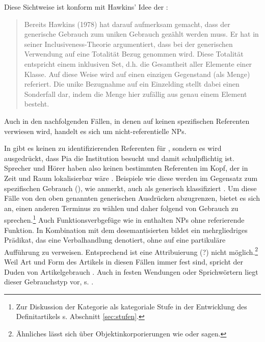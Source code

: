 Diese Sichtweise ist konform mit Hawkins' Idee der :  \blockcquote[43]{Studler2011}{Bereits Hawkins (1978) hat darauf aufmerksam gemacht, dass der generische Gebrauch zum uniken Gebrauch gezählt werden muss. Er hat in seiner Inclusiveness-Theorie argumentiert, dass bei der generischen Verwendung auf eine Totalität Bezug genommen wird. Diese Totalität entspricht einem inklusiven Set, d.h. die Gesamtheit
aller Elemente einer Klasse. Auf diese Weise wird auf einen einzigen Gegenstand (als
Menge) referiert. Die unike Bezugnahme auf ein Einzelding stellt dabei einen Sonderfall
dar, indem die Menge hier zufällig aus genau einem Element besteht.} 



Auch in den nachfolgenden Fällen, in denen  auf keinen spezifischen Referenten verwiesen wird, handelt es sich um nicht-referentielle NPs. 

\begin{exe}
	\ex \label{ex:nonref}   
	\begin{xlist}
		\ex \label{ex:schule-pia}  
		\ex \label{ex:fvg} 
		\end{xlist}
\end{exe}
\noindent 
In  gibt es keinen zu identifizierenden Referenten für , sondern es wird ausgedrückt, dass Pia die Institution  besucht und damit schulpflichtig ist. Sprecher und Hörer haben also keinen bestimmten Referenten im Kopf, der in Zeit und Raum lokalisierbar wäre \parencite[40]{Bisle-Muller1991}. Beispiele wie diese werden im Gegensatz zum spezifischen Gebrauch (), wie \textcite[245]{Studler2011} anmerkt, auch als generisch klassifiziert \parencite[ähnlich][90]{Szczepaniak2011a}. Um diese Fälle von den oben genannten generischen Ausdrücken abzugrenzen, bietet es sich an, einen anderen Terminus zu wählen und daher \textcite[54]{Bisle-Muller1991} folgend von  Gebrauch zu sprechen.\footnote{Zur Diskussion der Kategorie  als kategoriale Stufe in der Entwicklung des Definitartikels s. Abschnitt \ref{sec:stufen}.} Auch Funktionsverbgefüge wie in  enthalten NPs ohne referierende Funktion. In Kombination mit dem desemantisierten  bildet  ein mehrgliedriges Prädikat, das eine Verbalhandlung denotiert, ohne auf eine partikuläre Aufführung zu verweisen. Entsprechend ist eine Attribuierung (?) nicht möglich.\footnote{Ähnliches lässt sich über Objektinkorporierungen wie  oder  sagen.} Weil Art und Form des Artikels in diesen Fällen immer fest sind, spricht der Duden von  Artikelgebrauch \parencite[297-298]{Duden2009}. Auch in festen Wendungen oder Sprichwörtern liegt dieser Gebrauchstyp vor, s. .   

